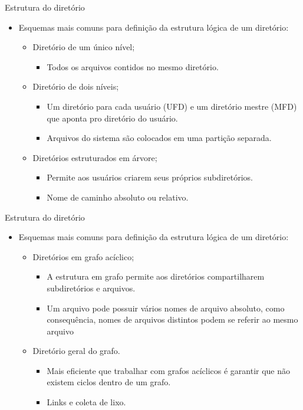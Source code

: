 \documentclass[10pt,brazil]{beamer}
\begin{document}
\begin{frame}{Estrutura do diretório}
\begin{itemize}
\item Esquemas mais comuns para definição da estrutura lógica de um diretório:
	\begin{itemize}
	\item Diretório de um único nível;
		\begin{itemize}
		\item Todos os arquivos contidos no mesmo diretório.
		\end{itemize}
	\item Diretório de dois níveis;
		\begin{itemize}
		\item Um diretório para cada usuário (UFD) e um diretório mestre (MFD) que aponta pro diretório do usuário.
		\item Arquivos do sistema são colocados em uma partição separada.
		\end{itemize}
	\item Diretórios estruturados em árvore;
		\begin{itemize}
		\item Permite aos usuários criarem seus próprios subdiretórios.
		\item Nome de caminho absoluto ou relativo.
		\end{itemize}
	\end{itemize}
\end{itemize}
\end{frame}

\begin{frame}{Estrutura do diretório}
\begin{itemize}
\item Esquemas mais comuns para definição da estrutura lógica de um diretório:
	\begin{itemize}
	\item Diretórios em grafo acíclico;
		\begin{itemize}
		\item A estrutura em grafo permite aos diretórios compartilharem subdiretórios e arquivos.
		\item Um arquivo pode possuir vários nomes de arquivo absoluto, como consequência, nomes de arquivos distintos podem se referir ao mesmo arquivo
		\end{itemize}
	\item Diretório geral do grafo.
	\begin{itemize}
	\item Mais eficiente que trabalhar com grafos acíclicos é garantir que não existem ciclos dentro de um grafo.
	\item Links e coleta de lixo.
	\end{itemize}
	\end{itemize}
\end{itemize}
\end{frame}
\end{document}

